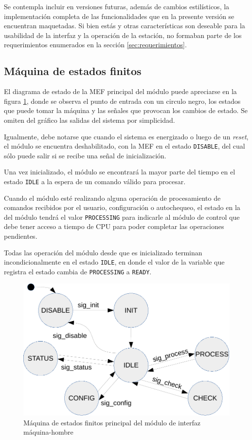 Se contempla incluir en versiones futuras, además de cambios estilísticos, la implementación completa de las funcionalidades que en la presente versión se encuentran maquetadas.  Si bien estás y otras características son deseable para la usabilidad de la interfaz y la operación de la estación, no formaban parte de los requerimientos enumerados en la sección \ref{sec:requerimientos}.



\subsection{Máquina de estados finitos}

El diagrama de estado de la MEF principal del módulo puede apreciarse en la figura \ref{fig:mef_HMI}, donde se observa el punto de entrada con un circulo negro, los estados que puede tomar la máquina y las señales que provocan los cambios de estado. Se omiten del gráfico las salidas del sistema por simplicidad.

Igualmente, debe notarse que cuando el sistema es energizado o luego de un \textit{reset}, el módulo se encuentra deshabilitado, con la MEF en el estado \texttt{DISABLE}, del cual sólo puede salir si se recibe una señal de inicialización.

Una vez inicializado, el módulo se encontrará la mayor parte del tiempo en el estado \texttt{IDLE} a la espera de un comando válido para procesar.

Cuando el módulo esté realizando alguna operación de procesamiento de comandos recibidos por el usuario, configuración o autochequeo, el estado en la del módulo tendrá el valor \texttt{PROCESSING} para indicarle al módulo de control que debe tener acceso a tiempo de CPU para poder completar las operaciones pendientes.

Todas las operación del módulo desde que es inicializado terminan incondicionalmente en el estado \texttt{IDLE}, en donde el valor de la variable que registra el estado cambia de \texttt{PROCESSING} a \texttt{READY}.

\begin{figure}[htpb]
	\centering
	\includegraphics[width=\textwidth]{./Figures/MEF_HMI_2.pdf}
	\caption[MEF principal del módulo de HMI]{Máquina de estados finitos principal del módulo de interfaz máquina-hombre}
	\label{fig:mef_HMI}
\end{figure}

